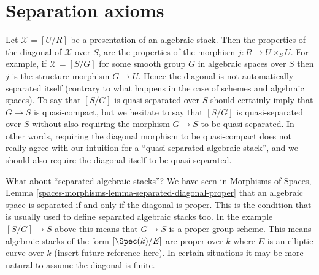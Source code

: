 \section{Separation axioms}
\label{section-separated}

\noindent
Let $\mathcal{X} = [U/R]$ be a presentation of an algebraic stack.
Then the properties of the diagonal of $\mathcal{X}$ over $S$, are
the properties of the morphism $j : R \to U \times_S U$. For example,
if $\mathcal{X} = [S/G]$ for some smooth group $G$ in algebraic spaces
over $S$ then $j$ is the structure morphism $G \to U$. Hence the diagonal
is not automatically separated itself (contrary to what happens in the
case of schemes and algebraic spaces). To say that $[S/G]$ is quasi-separated
over $S$ should certainly imply that $G \to S$ is quasi-compact, but we
hesitate to say that $[S/G]$ is quasi-separated over $S$ without also
requiring the morphism $G \to S$ to be quasi-separated. In other words,
requiring the diagonal morphism to be quasi-compact does not really agree
with our intuition for a ``quasi-separated algebraic stack'', and we should
also require the diagonal itself to be quasi-separated.

\medskip\noindent
What about ``separated algebraic stacks''? We have seen in
Morphisms of Spaces,
Lemma \ref{spaces-morphisms-lemma-separated-diagonal-proper}
that an algebraic space is separated if and only if the diagonal is proper.
This is the condition that is usually used to define separated algebraic
stacks too. In the example $[S/G] \to S$ above this means that $G \to S$
is a proper group scheme. This means algebraic stacks of the form
$[\Spec(k)/E]$ are proper over $k$ where $E$ is an elliptic curve
over $k$ (insert future reference here). In certain situations it may be
more natural to assume the diagonal is finite.

